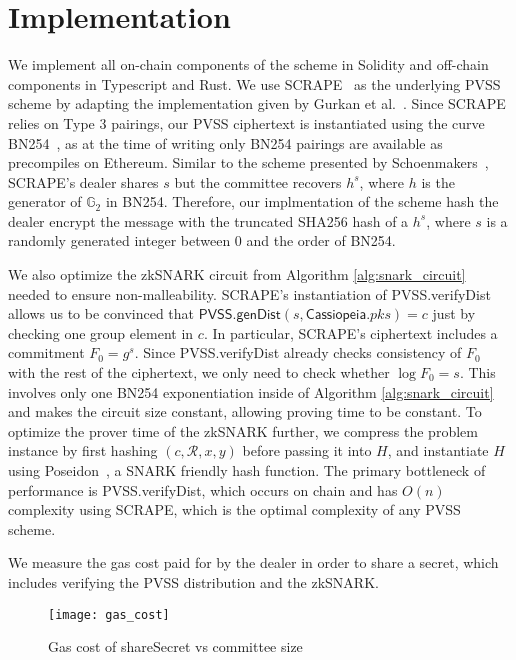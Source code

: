 \section{Implementation}

We implement all on-chain components of the scheme in Solidity and off-chain components in Typescript and Rust.
We use SCRAPE~\cite{pvss_scrape} as the underlying PVSS scheme by adapting the implementation given by Gurkan et al.~\cite{aggregatable_dkg}.
Since SCRAPE relies on Type 3 pairings, our PVSS ciphertext is instantiated using the curve BN254~\cite{bn254}, as at the time of writing only BN254 pairings are available as precompiles on Ethereum.
Similar to the scheme presented by Schoenmakers~\cite{pvss_schoenmakers}, SCRAPE's dealer shares $s$ but the committee recovers $h^s$, where $h$ is the generator of $\mathbb{G}_2$ in BN254.
Therefore, our implmentation of the scheme hash the dealer encrypt the message with the truncated SHA256 hash of a $h^s$, where $s$ is a randomly generated integer between 0 and the order of BN254.

We also optimize the zkSNARK circuit from Algorithm \ref{alg:snark_circuit} needed to ensure non-malleability.
SCRAPE's instantiation of \textsf{PVSS.verifyDist} allows us to be convinced that $\textsf{PVSS.genDist}(s, \textsf{Cassiopeia}.pks) = c$ just by checking one group element in $c$.
In particular, SCRAPE's ciphertext includes a commitment $F_0 = g^s$.
Since \textsf{PVSS.verifyDist} already checks consistency of $F_0$ with the rest of the ciphertext, we only need to check whether $\log F_0 = s$.
This involves only one BN254 exponentiation inside of Algorithm \ref{alg:snark_circuit} and makes the circuit size constant, allowing proving time to be constant.
To optimize the prover time of the zkSNARK further, we compress the problem instance by first hashing $(c, \mathcal{R}, x, y)$ before passing it into $H$, and instantiate $H$ using Poseidon~\cite{poseidon}, a SNARK friendly hash function.
The primary bottleneck of performance is \textsf{PVSS.verifyDist}, which occurs on chain and has $O(n)$ complexity using SCRAPE, which is the optimal complexity of any PVSS scheme.


We measure the gas cost paid for by the dealer in order to share a secret, which includes verifying the PVSS distribution and the zkSNARK.
\begin{figure}
\caption{Gas cost of \textsf{shareSecret} vs committee size}
\texttt{[image: gas\_cost]}
\end{figure}

